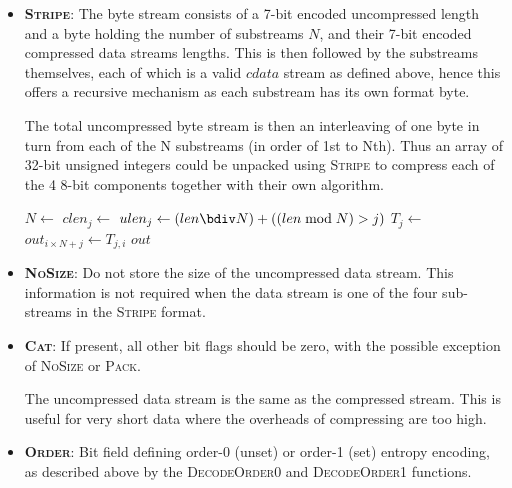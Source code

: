 \documentclass[a4paper]{article}
\begin{document}
\begin{itemize}
\item{\textbf{\textsc{Stripe}}:}
The byte stream consists of a 7-bit encoded uncompressed length and a
byte holding the number of substreams $N$, and their 7-bit encoded
compressed data streams lengths.  This is then followed by the
substreams themselves, each of which is a valid $cdata$ stream as
defined above, hence this offers a recursive mechanism as each
substream has its own format byte.

The total uncompressed byte stream is then an interleaving of one byte
in turn from each of the N substreams (in order of 1st to Nth).  Thus
an array of 32-bit unsigned integers could be unpacked using
\textsc{Stripe} to compress each of the 4 8-bit components together with
their own algorithm.

\begin{algorithmic}[1]
  \State $N \gets $
   
    \State $clen_j \gets $
  \EndFor
  \Statex
   
    \State $ulen_j \gets (len \bdiv N) + ((len \bmod N) > j)$
    \State $T_j \gets $
  \EndFor
  \Statex
   
      \State $out_{i \times N + j} \gets T_{j,i}$
    \EndFor
  \EndFor
  \State \Return $out$
\EndFunction
\end{algorithmic}

\item{\textbf{\textsc{NoSize}}:}
Do not store the size of the uncompressed data stream.
This information is not required when the data stream is one of the four sub-streams in the \textsc{Stripe} format.

\item{\textbf{\textsc{Cat}}:}
If present, all other bit flags should be zero, with the possible
exception of \textsc{NoSize} or \textsc{Pack}.

The uncompressed data stream is the same as the compressed stream.
This is useful for very short data where the overheads of compressing are too high.

\item{\textbf{\textsc{Order}}:}
Bit field defining order-0 (unset) or order-1 (set) entropy encoding, as described above by the \textsc{DecodeOrder0} and \textsc{DecodeOrder1} functions.


\end{itemize}
\end{document}
